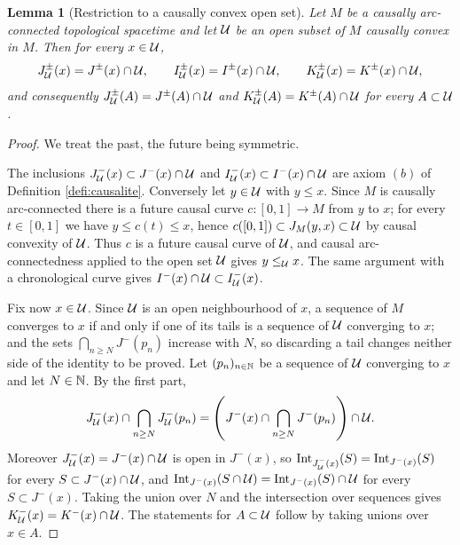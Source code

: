 \documentclass[a4paper,twoside]{article}
\newtheorem{lem}{Lemma}[section]
\begin{document}
\begin{lem}[Restriction to a causally convex open set]\label{lem:restriction_convexe}
Let $M$ be a causally arc-connected topological spacetime and let $\mathcal{U}$ be an open subset of $M$
causally convex in $M$. Then for every $x\in \mathcal{U}$,
$$J^\pm_{\mathcal{U}}(x)=J^\pm(x)\cap \mathcal{U},\qquad I^\pm_{\mathcal{U}}(x)=I^\pm(x)\cap \mathcal{U},\qquad K^\pm_{\mathcal{U}}(x)=K^\pm(x)\cap \mathcal{U},$$
and consequently $J^\pm_{\mathcal{U}}(A)=J^\pm(A)\cap \mathcal{U}$ and $K^\pm_{\mathcal{U}}(A)=K^\pm(A)\cap \mathcal{U}$ for every $A\subset \mathcal{U}$.
\end{lem}
\begin{proof}
We treat the past, the future being symmetric.

The inclusions $J^-_{\mathcal{U}}(x)\subset J^-(x)\cap \mathcal{U}$ and $I^-_{\mathcal{U}}(x)\subset I^-(x)\cap \mathcal{U}$ are axiom $(b)$ of
Definition \ref{defi:causalite}. Conversely let $y\in \mathcal{U}$ with $y\leq x$. Since $M$ is causally
arc-connected there is a future causal curve $c:[0,1]\rightarrow M$ from $y$ to $x$; for every
$t\in[0,1]$ we have $y\leq c(t)\leq x$, hence $c([0,1])\subset J_M(y,x)\subset \mathcal{U}$ by causal convexity
of $\mathcal{U}$. Thus $c$ is a future causal curve of $\mathcal{U}$, and causal arc-connectedness applied to the open
set $\mathcal{U}$ gives $y\leq_{\mathcal{U}} x$. The same argument with a chronological curve gives
$I^-(x)\cap \mathcal{U}\subset I^-_{\mathcal{U}}(x)$.

Fix now $x\in \mathcal{U}$. Since $\mathcal{U}$ is an open neighbourhood of $x$, a sequence of $M$ converges to $x$ if
and only if one of its tails is a sequence of $\mathcal{U}$ converging to $x$; and the sets
$\bigcap_{n\geq N}J^-(p_n)$ increase with $N$, so discarding a tail changes neither side of the
identity to be proved. Let $(p_n)_{n\in \mathbb{N}}$ be a sequence of $\mathcal{U}$ converging to $x$ and let $N\in \mathbb{N}$.
By the first part,
$$J^-_{\mathcal{U}}(x)\cap \bigcap_{n\geq N} J^-_{\mathcal{U}}(p_n)=\left(J^-(x)\cap \bigcap_{n\geq N} J^-(p_n)\right)\cap \mathcal{U} .$$
Moreover $J^-_{\mathcal{U}}(x)=J^-(x)\cap \mathcal{U}$ is open in $J^-(x)$, so
$\mathrm{Int}_{J^-_{\mathcal{U}}(x)}(S)=\mathrm{Int}_{J^-(x)}(S)$ for every $S\subset J^-(x)\cap \mathcal{U}$, and
$\mathrm{Int}_{J^-(x)}(S\cap \mathcal{U})=\mathrm{Int}_{J^-(x)}(S)\cap \mathcal{U}$ for every $S\subset J^-(x)$. Taking
the union over $N$ and the intersection over sequences gives $K^-_{\mathcal{U}}(x)=K^-(x)\cap \mathcal{U}$. The statements
for $A\subset \mathcal{U}$ follow by taking unions over $x\in A$.
\end{proof}
\end{document}
